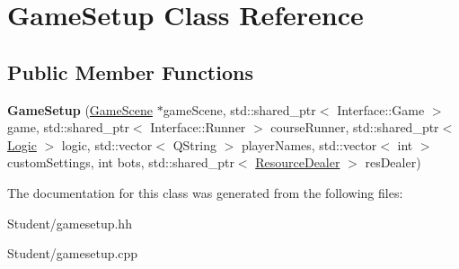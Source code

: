 \hypertarget{class_game_setup}{\section{Game\-Setup Class Reference}
\label{class_game_setup}
}
\subsection*{Public Member Functions}
\begin{DoxyCompactItemize}
\item 
\hypertarget{class_game_setup_a8465cd18e292e7ed43c36b64062ac788}{{\bfseries Game\-Setup} (\hyperlink{class_game_scene}{Game\-Scene} $\ast$game\-Scene, std\-::shared\-\_\-ptr$<$ Interface\-::\-Game $>$ game, std\-::shared\-\_\-ptr$<$ Interface\-::\-Runner $>$ course\-Runner, std\-::shared\-\_\-ptr$<$ \hyperlink{class_logic}{Logic} $>$ logic, std\-::vector$<$ Q\-String $>$ player\-Names, std\-::vector$<$ int $>$ custom\-Settings, int bots, std\-::shared\-\_\-ptr$<$ \hyperlink{class_resource_dealer}{Resource\-Dealer} $>$ res\-Dealer)}\label{class_game_setup_a8465cd18e292e7ed43c36b64062ac788}

\end{DoxyCompactItemize}


The documentation for this class was generated from the following files\-:\begin{DoxyCompactItemize}
\item 
Student/gamesetup.\-hh\item 
Student/gamesetup.\-cpp\end{DoxyCompactItemize}
